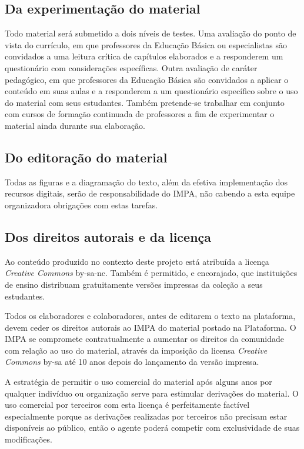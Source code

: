 \documentclass[10 pt]{article}
\begin{document}
\subsection{Da experimentação do material}


Todo material será submetido a dois níveis de testes. 
Uma avaliação do ponto de vista do currículo, em que professores da Educação Básica ou especialistas são convidados a uma leitura crítica de capítulos elaborados e a responderem um questionário com considerações específicas. 
Outra avaliação de caráter pedagógico, em que professores da Educação Básica são convidados a aplicar o conteúdo em suas aulas e a responderem a um questionário específico sobre o uso do material com seus estudantes. Também pretende-se trabalhar em conjunto com cursos de formação continuada de professores a fim de experimentar o material ainda durante sua elaboração.

\subsection{Do editoração do material}

Todas as figuras e a diagramação do texto, além da efetiva implementação dos recursos digitais, serão de responsabilidade do IMPA, não cabendo a esta equipe organizadora obrigações com estas tarefas.

\subsection{Dos direitos autorais e da licença}


Ao conteúdo produzido no contexto deste projeto está atribuída a licença {\it Creative Commons} by-sa-nc.
Também é permitido, e encorajado, que instituições de ensino distribuam gratuitamente versões impressas da coleção a seus estudantes. 

Todos os elaboradores e colaboradores, antes de editarem o texto na plataforma, devem ceder os direitos autorais ao IMPA do material postado na Plataforma.
O IMPA se compromete contratualmente a aumentar os direitos da comunidade com relação ao uso do  material, através da imposição da licensa {\it Creative Commons} by-sa até 10 anos depois do lançamento da versão impressa.

A estratégia de permitir o uso comercial do material após alguns anos por qualquer indivíduo ou organização serve para estimular derivações do material.
O uso comercial por terceiros com esta licença é perfeitamente factível especialmente porque as derivações realizadas por terceiros não precisam estar disponíveis ao público, então o agente poderá competir com exclusividade de suas modificações.
\end{document}
